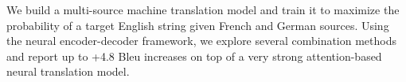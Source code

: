 We build a multi-source machine translation model and train it to maximize the probability of a target English string given French and German sources.  Using the neural encoder-decoder framework, we explore several combination methods and report up to +4.8 Bleu increases on top of a very strong attention-based neural translation model.
